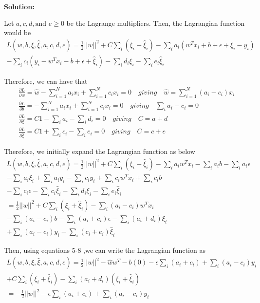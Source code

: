 \documentclass[12pt,a4paper]{article}
\begin{document}
	\noindent \textbf{Solution:}
	\vspace{0.2cm}
	
	\noindent Let $a, c, d, \text{and } e \geq 0$ be the Lagrange multipliers. Then, the Lagrangian function would be
	\begin{align*}
		L(w, b, \xi, \hat{\xi}, a, c, d, e) = \frac{1}{2}||w||^2 + C\sum_{i}(\xi_i+\hat{\xi}_i)-\sum_{i}a_i(w^Tx_i+b+\epsilon+\xi_i-y_i)\\-\sum_{i}c_i(y_i-w^Tx_i-b+\epsilon+\hat{\xi}_i)-\sum_{i}d_i\xi_i-\sum_{i}e_i\hat{\xi}_i \quad \quad
	\end{align*}
	
	\noindent Therefore, we can have that
	\begin{align}
		\frac{\partial L}{\partial w} =\hat{w} -\sum_{i=1}^{N}a_ix_i + \sum_{i=1}^{N}c_ix_i=0 \quad giving \quad \hat{w}=\sum_{i=1}^{N}(a_i-c_i)x_i\\
		\frac{\partial L}{\partial b} =-\sum_{i=1}^{N}a_ix_i+\sum_{i=1}^{N}c_ix_i = 0 \quad giving \quad \sum_{i}a_i-c_i= 0\quad\\
		\frac{\partial L}{\partial \xi} = C1-\sum_{i}a_i-\sum_{i}d_i= 0\quad giving 
		\quad C = a+d\qquad \\
		\frac{\partial L}{\partial \hat{\xi}} =C1+\sum_{i}c_i-\sum_{i}e_i= 0\quad giving 
		\quad C = c+e \qquad
	\end{align}
	
	\noindent Therefore, we initially expand the Lagrangian function as below
	\begin{align*}
	L(w, b, \xi, \hat{\xi}, a, c, d, e) = 
	\frac{1}{2}||w||^2
	+ C\sum_{i}(\xi_i+\hat{\xi}_i)
	-\sum_{i}a_iw^Tx_i
	-\sum_{i}a_ib
	-\sum_{i}a_i\epsilon \\
	-\sum_{i}a_i\xi_i
	+\sum_{i}a_iy_i
	-\sum_{i}c_iy_i
	+\sum_{i}c_iw^Tx_i
	+\sum_{i}c_ib \qquad\\
	-\sum_{i}c_i\epsilon
	-\sum_{i}c_i\hat{\xi}_i
	-\sum_{i}d_i\xi_i-\sum_{i}e_i\hat{\xi}_i \qquad\qquad\qquad\qquad \\
	 = 
	\frac{1}{2}||w||^2
	+ C\sum_{i}(\xi_i+\hat{\xi}_i)
	-\sum_{i}(a_i-c_i)w^Tx_i\qquad\qquad \quad\\
	-\sum_{i}(a_i-c_i)b
	-\sum_{i}(a_i+c_i)\epsilon
	-\sum_{i}(a_i+d_i)\xi_i\qquad\qquad\\
	+\sum_{i}(a_i-c_i)y_i
	-\sum_{i}(c_i+e_i)\hat{\xi}_i\qquad\qquad \qquad\qquad\qquad
	\end{align*}
	
	\noindent Then, using equations 5-8 ,we can write the Lagrangian function as 
	\begin{align*}
	L(w, b, \xi, \hat{\xi}, a, c, d, e) = 
	\frac{1}{2}||w||^2-\hat{w}w^T-b(0)-\epsilon\sum_{i}(a_i+c_i)+\sum_{i}(a_i-c_i)y_i\\
	+ C\sum_{i}(\xi_i+\hat{\xi}_i)
	-\sum_{i}(a_i+d_i)(\xi_i+\hat{\xi}_i)\qquad\qquad\qquad \quad\\ =-\frac{1}{2}||w||^2-\epsilon\sum_{i}(a_i+c_i)+\sum_{i}(a_i-c_i)y_i\qquad\qquad \quad
	\end{align*}
\end{document}
